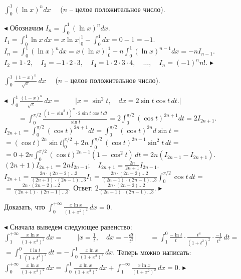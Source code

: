 \documentclass[a5paper,10pt]{article}
\begin{document}
\medskip
{} $\displaystyle \int_{0}^{1}(\ln x)^ndx\quad$ ($n$ -- целое
положительное число).

\smallskip
\noindent $\blacktriangleleft$ Обозначим
$\displaystyle I_n=\int_{0}^{1}(\ln x)^ndx.\quad$
$\displaystyle I_1=\int_{0}^{1}\ln x\,dx=x\ln x\Big|_{0}^{1}-\int_{0}^{1}dx=0-1=-1.$\\
$\displaystyle I_n=\int_{0}^{1}(\ln x)^ndx=x(\ln x)\Big|_{0}^{1}-n\int_{0}^{1}(\ln x)^{n-1}dx=-nI_{n-1}.$\\
$I_2=1\cdot2,\quad I_3=-1\cdot2\cdot3,\quad I_4=1\cdot2\cdot3\cdot4,\quad\ldots,\quad I_n=(-1)^nn!.$ $\blacktriangleright$

\medskip
{} $\displaystyle \int_0^1\frac{(1-x)^n}{\sqrt x}\,dx\quad$ ($n$ -- целое
положительное число).

\smallskip
\noindent $\blacktriangleleft$ $\displaystyle \int_0^1\frac{(1-x)^n}{\sqrt x}\,dx=\qquad\Big|x=\sin^2t,\quad dx=2\sin t\cos t\,dt.\Big|$\\
$\displaystyle \qquad=\int_0^{\pi/2}\frac{(1-\sin^2t)^n\cdot2\sin t\cos t\,dt}{\sin t}
=2\int_0^{\pi/2}(\cos t)^{2n+1}dt=2I_{2n+1}.$\\
$\displaystyle I_{2n+1}=\int_0^{\pi/2}(\cos t)^{2n+1}dt=\int_0^{\pi/2}(\cos t)^{2n}d\sin t=$\\
$\displaystyle =(\cos t)^{2n}\sin t\Big|_0^{\pi/2}+2n\int_0^{\pi/2}(\cos t)^{2n-1}\sin^2t\,dt=$\\
$\displaystyle =0+2n\int_0^{\pi/2}(\cos t)^{2n-1}(1-\cos^2t)\,dt=2n(I_{2n-1}-I_{2n+1}).$\\
$\displaystyle (2n+1)I_{2n+1}=2nI_{2n-1};\quad I_{2n+1}=\frac{2n}{2n+1}I_{2n-1}.$\\
$\displaystyle I_{2n+1}=\frac{2n\cdot(2n-2)\ldots2}{(2n+1)\cdot(2n-1)\ldots3}I_1=\frac{2n\cdot(2n-2)\ldots2}{(2n+1)\cdot(2n-1)\ldots3}\int_0^{\pi/2}\cos t\,dt=$\\
$\displaystyle =\frac{2n\cdot(2n-2)\ldots2}{(2n+1)\cdot(2n-1)\ldots3}.$\qquad
Ответ: $\displaystyle 2\frac{2n\cdot(2n-2)\ldots2}{(2n+1)\cdot(2n-1)\ldots3}$. $\blacktriangleright$

\medskip
{} Доказать, что $\displaystyle \int_{0}^{+\infty}
\frac{x\ln x}{(1+x^2)^2}\,dx=0$.

\smallskip
\noindent $\blacktriangleleft$ Сначала выведем следующее равенство:\\
$\displaystyle \int_{1}^{+\infty}\frac{x\ln x}{(1+x^2)^2}\,dx=\qquad\Big|x=\frac1t,\quad dx=-\frac{dt}{t^2}\Big|\qquad =\int_{1}^{0}\frac{-\ln t}{t}\cdot\frac{t^4}{(1+t^2)^2}\cdot\frac{-1}{t^2}\,dt=$\\
$\displaystyle =\int_{1}^{0}\frac{t\ln t}{(1+t^2)^2}\,dt=-\int_{0}^{1}\frac{x\ln x}{(1+x^2)^2}\,dx.$\quad
Теперь можно написать:\\
$\displaystyle \int_{0}^{+\infty}\frac{x\ln x}{(1+x^2)^2}\,dx=
\int_{0}^{1}\frac{x\ln x}{(1+x^2)^2}\,dx+\int_{1}^{+\infty}\frac{x\ln x}{(1+x^2)^2}\,dx=0.$ $\blacktriangleright$
\end{document}
